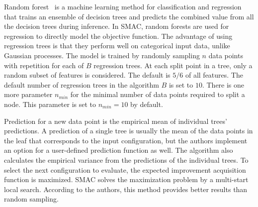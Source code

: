 Random forest~\cite{breiman2001random} is a machine learning method for classification and regression that trains an ensemble of decision trees and predicts the combined value from all the decision trees during inference. In SMAC, random forests are used for regression to directly model the objective function. The advantage of using regression trees is that they perform well on categorical input data, unlike Gaussian processes. The model is trained by randomly sampling $n$ data points with repetition for each of $B$ regression trees. At each split point in a tree, only a random subset of features is considered. The default is $5/6$ of all features. The default number of regression trees in the algorithm $B$ is set to $10$. There is one more parameter $n_{min}$ for the minimal number of data points required to split a node. This parameter is set to $n_{min}=10$ by default.

Prediction for a new data point is the empirical mean of individual trees' predictions. A prediction of a single tree is usually the mean of the data points in the leaf that corresponds to the input configuration, but the authors implement an option for a user-defined prediction function as well. The algorithm also calculates the empirical variance from the predictions of the individual trees. To select the next configuration to evaluate, the expected improvement acquisition function is maximized. SMAC solves the maximization problem by a multi-start local search. According to the authors, this method provides better results than random sampling.
